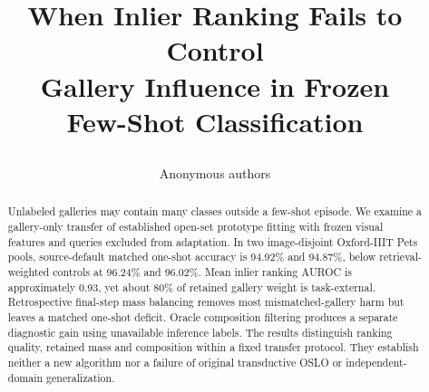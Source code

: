 \documentclass{article}
\title{\raggedright When Inlier Ranking Fails to Control\\Gallery Influence in Frozen\\Few-Shot Classification}
\author{Anonymous authors}
\begin{document}
\maketitle
\raggedbottom
{}
\begin{abstract}
Unlabeled galleries may contain many classes outside a few-shot episode. We examine a gallery-only transfer of established open-set prototype fitting with frozen visual features and queries excluded from adaptation. In two image-disjoint Oxford-IIIT Pets pools, source-default matched one-shot accuracy is 94.92\% and 94.87\%, below retrieval-weighted controls at 96.24\% and 96.02\%. Mean inlier ranking AUROC is approximately 0.93, yet about 80\% of retained gallery weight is task-external. Retrospective final-step mass balancing removes most mismatched-gallery harm but leaves a matched one-shot deficit. Oracle composition filtering produces a separate diagnostic gain using unavailable inference labels. The results distinguish ranking quality, retained mass and composition within a fixed transfer protocol. They establish neither a new algorithm nor a failure of original transductive OSLO or independent-domain generalization.
\end{abstract}





\begingroup
\setlength{\bibsep}{2pt}


\endgroup
\clearpage

\end{document}

